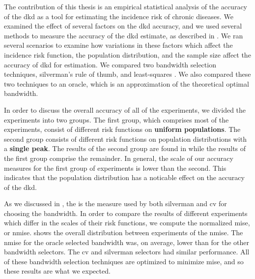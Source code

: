 

The contribution of this thesis is an empirical statistical analysis of the accuracy of the \gls{dkd}
as a tool for estimating the incidence risk of chronic diseases.
We examined the effect of several factors on the \gls{dkd} accuracy,
and we used several methods to measure the accuracy of the \gls{dkd} estimate,
as described in .
We ran several scenarios to examine how variations in these factors which affect the incidence risk function,
the population distribution, and the sample size affect the accuracy of \gls{dkd} for estimation.
We compared two bandwidth selection techniques, \gls{silverman}'s rule of thumb,
and least-squares .
We also compared these two techniques to an \gls{oracle},
which is an approximation of the theoretical optimal bandwidth.

In order to discuss the overall accuracy of all of the experiments,
we divided the experiments into two groups.
The first group, which comprises most of the experiments,
consist of different \gls{risk} functions on \textbf{uniform populations}.
The second group consists of different \gls{risk} functions on population distributions with a \textbf{single peak}.
The results of the second group are found in  while the results of the first group comprise the remainder.
In general, the scale of our accuracy measures for the first group of experiments is lower than the second.
This indicates that the population distribution has a noticable effect on the accuracy of the \gls{dkd}.

As we discussed in ,
the  is the measure used by both \gls{silverman} and \gls{cv} for choosing the bandwidth.
In order to compare the results of different experiments which differ in the scales of their \gls{risk} functions,
we compute the normalized \gls{mise}, or \gls{nmise}. 
 shows the overall distribution between experiments of the \gls{nmise}.
The \gls{nmise} for the \gls{oracle} selected bandwidth was, on average,
lower than for the other bandwidth selectors.
The \gls{cv} and \gls{silverman} selectors had similar performance.
All of these bandwidth selection techniques are optimized to minimize \gls{mise},
and so these results are what we expected.

